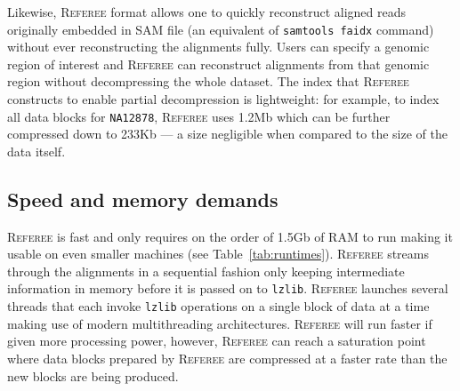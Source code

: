 \documentclass[12pt]{cmuthesis}
\newcommand{\refer}{\textsc{Referee}\xspace}
\begin{document}
  
  Likewise, \refer format allows one to quickly reconstruct aligned reads originally embedded in SAM file (an equivalent of \texttt{samtools faidx} command) without ever reconstructing the alignments fully. Users can specify a genomic region of interest and \refer can reconstruct alignments from that genomic region without decompressing the whole dataset. The index that \refer constructs to enable partial decompression is lightweight: for example, to index all data blocks for \texttt{NA12878}, \refer uses 1.2Mb which can be further compressed down to 233Kb --- a size negligible when compared to the size of the data itself.




  \subsection{Speed and memory demands}

  \refer is fast and only requires on the order of 1.5Gb of RAM to run making it usable on even smaller machines (see Table~\ref{tab:runtimes}). \refer streams through the alignments in a sequential fashion only keeping intermediate information in memory before it is passed on to \texttt{lzlib}. \refer launches several threads that each invoke \texttt{lzlib} operations on a single block of data at a time making use of modern multithreading architectures. \refer will run faster if given more processing power, however, \refer can reach a saturation point where data blocks prepared by \refer are compressed at a faster rate than the new blocks are being produced.




\end{document}
